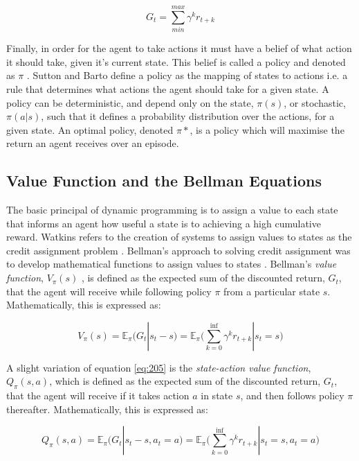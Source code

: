 \begin{equation}
	G_t = \sum_{min}^{max}\gamma^k r_{t+k} \label{eq:204}
\end{equation}

Finally, in order for the agent to take actions it must have a belief of what action it should take, given it's current state. This belief is called a policy and denoted as $\pi$ \cite{Sutton2018}. Sutton and Barto define a  policy as the mapping of states to actions i.e. a rule that determines what actions the agent should take for a given state. A policy can be deterministic, and depend only on the state, $\pi(s)$, or stochastic, $\pi(a|s)$, such that it defines a probability distribution over the actions, for a given state. An optimal policy, denoted $\pi*$, is a policy which will maximise the return an agent receives over an episode.


\subsection{Value Function and the Bellman Equations}
The basic principal of dynamic programming is to assign a value to each state that informs an agent how useful a state is to achieving a high cumulative reward. Watkins refers to the creation of systems to assign values to states as the credit assignment problem \cite{Watkin1989}. Bellman's approach to solving credit assignment was to develop mathematical functions to assign values to states \cite{Bellm1954}. Bellman's \textit{value function}, $V_{\pi}(s)$ , is defined as the expected sum of the discounted return, $G_t$, that the agent will receive while following policy $\pi$ from a particular state $s$. Mathematically, this is expressed as:

\begin{equation}
	V_{\pi}(s) = \mathbb{E}_{\pi} \big( G_t | s_t - s \big) = \mathbb{E}_{\pi} \bigg( \sum_{k = 0}^{\inf} \gamma^k r_{t+k} | s_t = s \bigg) \label{eq:205}
\end{equation}

A slight variation of equation \ref{eq:205} is the \textit{state-action value function}, $Q_{\pi}(s,a)$, which is defined as the expected sum of the discounted return, $G_t$, that the agent will receive if it takes action $a$ in state $s$, and then follows policy $\pi$ thereafter. Mathematically, this is expressed as:

\begin{equation}
	Q_{\pi}(s, a) = \mathbb{E}_{\pi} \big( G_t | s_t - s, a_t = a \big) = \mathbb{E}_{\pi} \bigg( \sum_{k = 0}^{\inf} \gamma^k r_{t+k} | s_t = s, a_t = a \bigg) \label{eq:206}
\end{equation}

